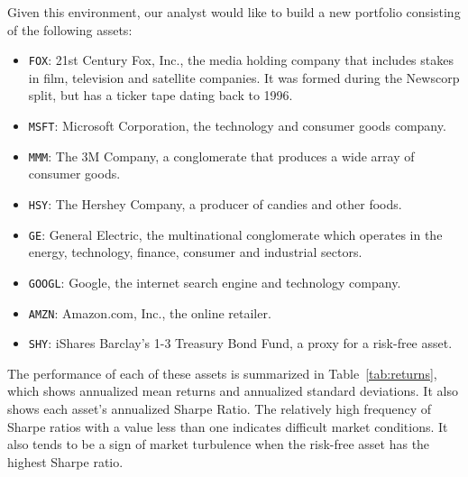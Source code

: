 \documentclass[a4paper]{article}\usepackage[]{graphicx}\usepackage[]{color}
\begin{document}
Given this environment, our analyst would like to build a new portfolio consisting of the following assets:

\begin{itemize}
    \item \texttt{FOX}: 21st Century Fox, Inc., the media holding company that includes stakes in film, television and satellite companies. It was formed during the Newscorp split, but has a ticker tape dating back to 1996.
    \item \texttt{MSFT}: Microsoft Corporation, the technology and consumer goods company.
    \item \texttt{MMM}: The 3M Company, a conglomerate that produces a wide array of consumer goods.
    \item \texttt{HSY}: The Hershey Company, a producer of candies and other foods.
    \item \texttt{GE}: General Electric, the multinational conglomerate which operates in the energy, technology, finance, consumer and industrial sectors.
    \item \texttt{GOOGL}: Google, the internet search engine and technology company.
    \item \texttt{AMZN}: Amazon.com, Inc., the online retailer.
    \item \texttt{SHY}: iShares Barclay's 1-3 Treasury Bond Fund, a proxy for a risk-free asset.
\end{itemize}

The performance of each of these assets is summarized in Table~\ref{tab:returns}, which shows annualized mean returns and annualized standard deviations. It also shows each asset's annualized Sharpe Ratio. The relatively high frequency of Sharpe ratios with a value less than one indicates difficult market conditions. It also tends to be a sign of market turbulence when the risk-free asset has the highest Sharpe ratio. 

\begin{table}[ht]
\centering
{}
\caption{Historical average returns, standard deviations and Sharpe ratios for the candidate assets over previous six months.} 
\label{tab:returns}
\end{table}
\end{document}
